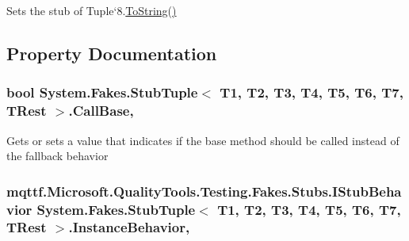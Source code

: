 Sets the stub of Tuple`8.\hyperlink{class_system_1_1_fakes_1_1_stub_tuple_3_01_t1_00_01_t2_00_01_t3_00_01_t4_00_01_t5_00_01_t6_00_01_t7_00_01_t_rest_01_4_af267b4c3ec9efe8c69e768b31e20ca13}{To\-String()}



\subsection{Property Documentation}
\hypertarget{class_system_1_1_fakes_1_1_stub_tuple_3_01_t1_00_01_t2_00_01_t3_00_01_t4_00_01_t5_00_01_t6_00_01_t7_00_01_t_rest_01_4_a8ccc3eeaf132df186ace052c196d36ec}{
\subsubsection[{Call\-Base}]{\setlength{\rightskip}{0pt plus 5cm}bool System.\-Fakes.\-Stub\-Tuple$<$ T1, T2, T3, T4, T5, T6, T7, T\-Rest $>$.Call\-Base\hspace{0.3cm}{\ttfamily [get]}, {\ttfamily [set]}}}\label{class_system_1_1_fakes_1_1_stub_tuple_3_01_t1_00_01_t2_00_01_t3_00_01_t4_00_01_t5_00_01_t6_00_01_t7_00_01_t_rest_01_4_a8ccc3eeaf132df186ace052c196d36ec}


Gets or sets a value that indicates if the base method should be called instead of the fallback behavior

\hypertarget{class_system_1_1_fakes_1_1_stub_tuple_3_01_t1_00_01_t2_00_01_t3_00_01_t4_00_01_t5_00_01_t6_00_01_t7_00_01_t_rest_01_4_aa7c1b9c85d24448b1e1fb41f38ed35f2}{
\subsubsection[{Instance\-Behavior}]{\setlength{\rightskip}{0pt plus 5cm}mqttf.\-Microsoft.\-Quality\-Tools.\-Testing.\-Fakes.\-Stubs.\-I\-Stub\-Behavior System.\-Fakes.\-Stub\-Tuple$<$ T1, T2, T3, T4, T5, T6, T7, T\-Rest $>$.Instance\-Behavior\hspace{0.3cm}{\ttfamily [get]}, {\ttfamily [set]}}}\label{class_system_1_1_fakes_1_1_stub_tuple_3_01_t1_00_01_t2_00_01_t3_00_01_t4_00_01_t5_00_01_t6_00_01_t7_00_01_t_rest_01_4_aa7c1b9c85d24448b1e1fb41f38ed35f2}


